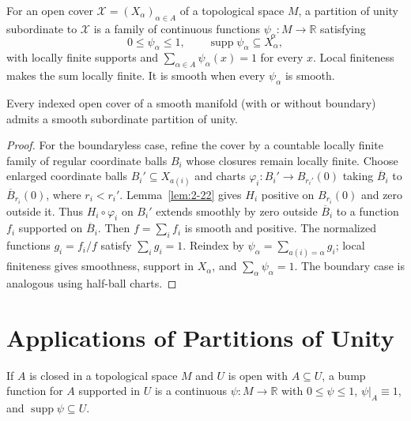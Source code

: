 \begin{definition}
\label{def:2-10-extra-4}



For an open cover $\mathcal X=(X_\alpha)_{\alpha\in A}$ of a topological space $M$, a partition of unity subordinate to $\mathcal X$ is a family of continuous functions $\psi_\alpha:M\to\mathbb R$ satisfying
\[
0\leq\psi_\alpha\leq1,\qquad \operatorname{supp}\psi_\alpha\subseteq X_\alpha,
\]
with locally finite supports and $\sum_{\alpha\in A}\psi_\alpha(x)=1$ for every $x$. Local finiteness makes the sum locally finite. It is smooth when every $\psi_\alpha$ is smooth.
\end{definition}

\begin{theorem}
\label{thm:2-23}




Every indexed open cover of a smooth manifold (with or without boundary) admits a smooth subordinate partition of unity.
\end{theorem}

\begin{proof}
\sketch For the boundaryless case, refine the cover by a countable locally
finite family of regular coordinate balls $B_i$ whose closures remain locally
finite. Choose enlarged coordinate balls $B_i'\subseteq X_{a(i)}$ and charts
$\varphi_i:B_i'\to B_{r_i'}(0)$ taking $\overline B_i$ to
$\overline B_{r_i}(0)$, where $r_i<r_i'$. Lemma~\ref{lem:2-22} gives $H_i$ positive on
$B_{r_i}(0)$ and zero outside it. Thus $H_i\circ\varphi_i$ on $B_i'$ extends
smoothly by zero outside $\overline B_i$ to a function $f_i$ supported on
$\overline B_i$. Then $f=\sum_i f_i$ is smooth and positive. The normalized
functions $g_i=f_i/f$ satisfy $\sum_i g_i=1$. Reindex by
$\psi_\alpha=\sum_{a(i)=\alpha}g_i$; local finiteness gives smoothness,
support in $X_\alpha$, and $\sum_\alpha\psi_\alpha=1$. The boundary case is
analogous using half-ball charts.
\end{proof}


\section{Applications of Partitions of Unity}

\begin{definition}
\label{def:2-11-extra-1}



If $A$ is closed in a topological space $M$ and $U$ is open with $A\subseteq U$, a bump function for $A$ supported in $U$ is a continuous $\psi:M\to\mathbb R$ with $0\leq\psi\leq1$, $\psi|_A\equiv1$, and $\operatorname{supp}\psi\subseteq U$.
\end{definition}

